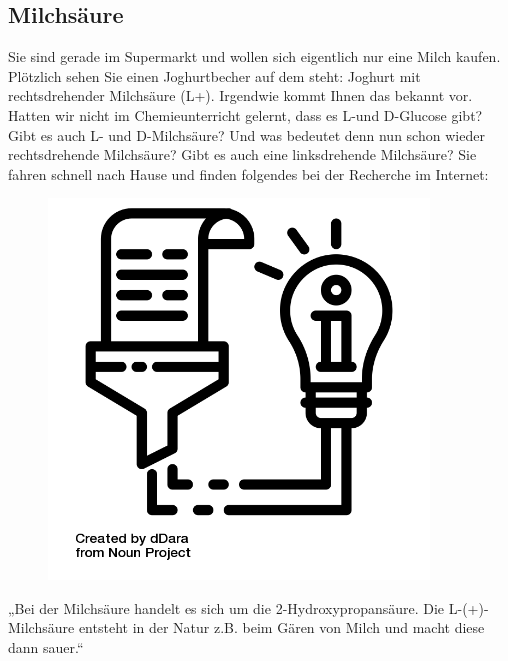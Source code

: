 \documentclass{scrartcl}  %
\begin{document}
		\subsection{Milchsäure}

			Sie sind gerade im Supermarkt und wollen sich eigentlich nur eine Milch kaufen. Plötzlich sehen Sie einen Joghurtbecher auf dem steht: Joghurt mit rechtsdrehender Milchsäure (L+). Irgendwie kommt Ihnen das bekannt vor. Hatten wir nicht im Chemieunterricht gelernt, dass es L-und D-Glucose gibt? Gibt es auch L- und D-Milchsäure? Und was bedeutet denn nun schon wieder rechtsdrehende Milchsäure? Gibt es auch eine linksdrehende Milchsäure? Sie fahren schnell nach Hause und finden folgendes bei der Recherche im Internet:

\vspace{0.3cm}
			\begin{tcolorbox}[enhanced,
				colback=white,
				colframe=darkgray,
				fonttitle=\sffamily\bfseries\large, 
				title=Recherche,  %
				attach boxed title to top left={xshift=3.2mm,yshift=-0.50mm},
				boxed title style={skin=enhancedfirst jigsaw,size=small,arc=1mm,bottom=-1mm,colframe=darkgray,height=0.75cm},
				colbacktitle=darkgray,
				drop lifted shadow]
				\begin{figure}  
					\centering
					\vspace{-14pt}  %
					\includegraphics[width=0.9\textwidth]{symbols/symbol_tex_content}
				\end{figure}
				
				„Bei der Milchsäure handelt es sich um die 2-Hydroxypropansäure. Die L-(+)-Milchsäure entsteht in der Natur z.B. beim Gären von Milch und macht diese dann sauer.“
				\vspace{1.5cm}
			\end{tcolorbox}		
\end{document}
